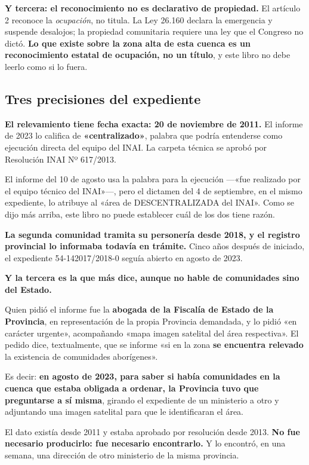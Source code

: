 \textbf{Y tercera: el reconocimiento no es declarativo de propiedad.} El artículo 2 reconoce
la \textit{ocupación}, no titula. La Ley 26.160 declara la emergencia y suspende desalojos;
la propiedad comunitaria requiere una ley que el Congreso no dictó. \textbf{Lo que existe
sobre la zona alta de esta cuenca es un reconocimiento estatal de ocupación, no un título}, y
este libro no debe leerlo como si lo fuera.

\subsection*{Tres precisiones del expediente}

\textbf{El relevamiento tiene fecha exacta: 20 de noviembre de 2011.} El informe de 2023 lo califica de \textbf{«centralizado»}, palabra que podría entenderse como ejecución directa del equipo del INAI. La carpeta técnica se aprobó por Resolución INAI Nº 617/2013.

El informe del 10 de agosto usa la palabra para la ejecución ---«fue realizado por el equipo técnico del INAI»---, pero el dictamen del 4 de septiembre, en el mismo expediente, lo atribuye al «área de DESCENTRALIZADA del INAI». Como se dijo más arriba, este libro no puede establecer cuál de los dos tiene razón.

\textbf{La segunda comunidad tramita su personería desde 2018, y el registro provincial
lo informaba todavía en trámite.} Cinco años después de iniciado, el expediente
54-142017/2018-0 seguía abierto en agosto de 2023.

\textbf{Y la tercera es la que más dice, aunque no hable de comunidades sino del Estado.}

Quien pidió el informe fue la \textbf{abogada de la Fiscalía de Estado de la Provincia}, en
representación de la propia Provincia demandada, y lo pidió «en carácter urgente»,
acompañando «mapa imagen satelital del área respectiva». El pedido dice, textualmente, que se
informe «si en la zona \textbf{se encuentra relevado} la existencia de comunidades
aborígenes».

Es decir: \textbf{en agosto de 2023, para saber si había comunidades en la cuenca que estaba
obligada a ordenar, la Provincia tuvo que preguntarse a sí misma}, girando el expediente de
un ministerio a otro y adjuntando una imagen satelital para que le identificaran el área.

El dato existía desde 2011 y estaba aprobado por resolución desde 2013. \textbf{No fue
necesario producirlo: fue necesario encontrarlo.} Y lo encontró, en una semana, una dirección
de otro ministerio de la misma provincia.

